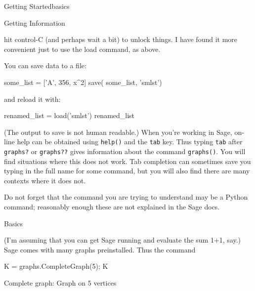 \begin{chap}{Getting Started}{basics}
\begin{sect}{Getting Information}
\begin{para}
hit control-C (and perhaps wait a bit) to unlock things.  I have found it more
convenient just to use the load command, as above.
\end{para}
%
\begin{para}
You can save data to a file:
\end{para}
%
\begin{sagecode}
\begin{sageinput}
some_list = ['A', 356, x^2]
save( some_list, 'smlst')
\end{sageinput}
\end{sagecode}
%
\begin{para}
and reload it with: 
\end{para}
%
\begin{sagecode}
\begin{sageinput}
renamed_list = load('smlst')
renamed_list
\end{sageinput}
\begin{sageoutput}
['A', 356, x^2]
\end{sageoutput}
\end{sagecode}
%
\begin{para}
(The output to save is not human readable.)             
When you're working in Sage, on-line help can be obtained using \texttt{help()} 
and the \texttt{tab} key. Thus typing \texttt{tab} after \texttt{graphs?} or \texttt{graphs??} gives 
information about the command \texttt{graphs()}.  You will find situations where this
does not work.  Tab completion can sometimes save you typing in the full name for
some command, but you will also find there are many contexts where it does not.
\end{para}
%
\begin{para}
Do not forget that the command you are trying to understand may be a Python
command; reasonably enough these are not explained in the Sage docs.
\end{para}
%
\end{sect}
%
\begin{sect}{Basics}
%
\begin{para}
(I'm assuming that you can get Sage running and evaluate the sum 1+1, say.)
Sage comes with many graphs preinstalled.  Thus the command
\end{para}
%
%
\begin{sagecode}
\begin{sageinput}
K = graphs.CompleteGraph(5); K
\end{sageinput}
\begin{sageoutput}
Complete graph: Graph on 5 vertices

\end{sageoutput}
\end{sagecode}
\end{sect}
\end{chap}
